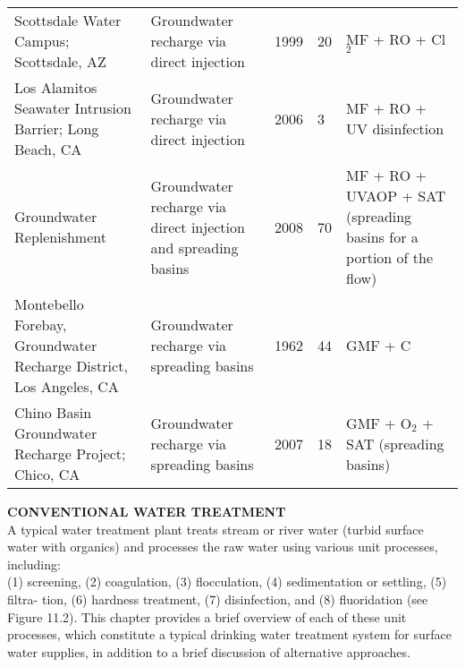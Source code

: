 \documentclass{article}
\begin{document}
\begin{table}[]
\begin{tabular}{lllll}
Scottsdale Water Campus; Scottsdale, AZ                            & Groundwater recharge via direct injection                      & 1999 & 20             & MF + RO + Cl$_2$ \\
Los Alamitos Seawater Intrusion Barrier; Long Beach, CA            & Groundwater recharge via direct injection                      & 2006 & 3              & MF + RO + UV disinfection                                          \\
Groundwater Replenishment                                          & Groundwater recharge via direct injection and spreading basins & 2008 & 70             & MF + RO + UVAOP + SAT (spreading basins for a portion of the flow) \\
Montebello Forebay, Groundwater Recharge District, Los Angeles, CA & Groundwater recharge via spreading basins                      & 1962 & 44             & GMF + C                                                            \\
Chino Basin Groundwater Recharge Project; Chico, CA                & Groundwater recharge via spreading basins                      & 2007 & 18             & GMF + O$_2$ + SAT (spreading basins)
\end{tabular}
\end{table}

\textbf{CONVENTIONAL WATER TREATMENT}\\
A typical water treatment plant treats stream or river water (turbid surface water with organics) and processes the raw water using various unit processes, including:\\
(1) screening, (2) coagulation, (3) flocculation, (4) sedimentation or settling, (5) filtra-
tion, (6) hardness treatment, (7) disinfection, and (8) fluoridation (see Figure 11.2). This chapter provides a brief overview of each of these unit processes, which constitute a typical drinking water treatment system for surface water supplies, in addition to a brief discussion of alternative approaches.\\
\end{document}
